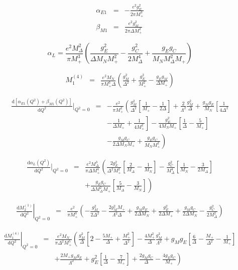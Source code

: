 \documentclass[12pt,preprint,tightenlines,
showpacs,preprintnumbers,amsmath,amssymb,
a4paper,nofootinbib]{revtex4-1}
\def\beq{\begin{equation}}
\def\eeq{\end{equation}}
\def\bea{\begin{eqnarray}}
\def\eea{\end{eqnarray}}
\def\eqlab#1{\label{eq:#1}}
\def\al{\alpha}
\def\be{\beta}
\def\nn{\nonumber}
\def\dd{\mathrm{d}}
\begin{document}
\bea
\eqlab{alphabetaQ2}
\al_{E1}&=&-\frac{e^2 g_E^2}{2 \pi  M_+^3}\\
\be_{M1}&=&\frac{e^2 g_M^2}{2 \pi  \varDelta  M_+^2}
\eea

\beq
\al_L=\frac{e^2 M_\Delta^2}{\pi M_+^3}\left(\frac{ g_E^2}{\varDelta  M_NM_+^2}-\frac{g_C^2}{2 M_\Delta^4}+\frac{ g_E g_C}{M_NM_\Delta^2 M_+}\right)
\eeq

\bea
M_1^{(4)}&=&\frac{e^2 M_N}{\pi M_+^3 \varDelta} \left(\frac{g_M^2}{\varDelta^2}+\frac{g_E^2}{M_+^2}-\frac{g_E g_M}{\varDelta M_+}\right)
\eea

\bea
\frac{\dd \left[\alpha_{E1}(Q^2)+\beta_{M1}(Q^2)\right]}{\dd Q^2}\Bigg\vert_{Q^2=0}&=&-\frac{e^2}{\pi M_+^2}\left(\frac{g_M^2}{\varDelta^2}\left[\frac{1}{M_+}-\frac{1}{2\varDelta}\right]+\frac{2}{ \Lambda^2 }\frac{g_M^2}{\varDelta}\right.+\frac{g_M g_E}{M_N}\left[\frac{1}{4\varDelta^2}\right.\\
&&\left.-\frac{1}{\varDelta M_+}+\frac{1}{4M_+^2}\right] -\frac{g_E^2}{4M_NM_+}\left[\frac{1}{\varDelta}-\frac{5}{M_+}\right]\nn\\
&&\left.-\frac{ g_M g_C}{2  \varDelta  M_NM_+}+\frac{g_E g_C}{M_NM_+^2}\right)\nn
\eea

\bea
\frac{\dd \al_L(Q^2)}{\dd Q^2}\Bigg\vert_{Q^2=0}&=&\frac{e^2 M_\Delta^3}{\pi \varDelta M_+^4}\left(\frac{2g_E^2}{\varDelta^2 M_+^2}\left[\frac{2}{M_\Delta}-\frac{1}{M_N}\right]-\frac{g_C^2}{ M_\Delta^4}\left[\frac{1}{M_N}-\frac{3}{2M_\Delta}\right]\right.  \\
&&+\left.\frac{g_E g_C}{\varDelta M_\Delta^2 M_+}\left[\frac{5}{M_\Delta}-\frac{3}{M_N}\right]\right)\nn
\eea

\bea
\left.\frac{\dd M_2^{(1)} }{\dd Q^2}\right|_{Q^2=0}&=&\frac{e^2 }{\pi M_+^3}\left(-\frac{g_M^2}{2\varDelta^2}-\frac{2g_M^2 M_+}{\Lambda^2 \varDelta}+\frac{g_M g_E}{2\varDelta M_N }+\frac{g_E^2}{2\varDelta M_+}+\frac{g_M g_C}{2\varDelta M_N}-\frac{g_C^2}{2M_\Delta^2}\right)
\eea

\bea
\left.\frac{\dd M_1^{(4)} }{\dd Q^2}\right|_{Q^2=0}&=&\frac{e^2 M_N}{\pi \varDelta^2 M_+^5}\left(\frac{g_M^2}{\varDelta}\left[2-\frac{5M_+}{\varDelta}+\frac{M_+^2}{\varDelta^2}\right]-\frac{4M_+^2}{\varDelta}\frac{g_M^2}{\Lambda^2}+g_M g_E \left[\frac{6}{\varDelta}-\frac{M_+}{\varDelta^2}-\frac{1}{M_+}\right]\right.\\
&&\left.+\frac{2M_+ g_M g_E}{\Lambda^2}+g_E^2\left[\frac{1}{\varDelta}-\frac{7}{M_+}\right]+\frac{2g_M g_C}{\varDelta}-\frac{4g_E g_C}{M_+}\right)\nn
\eea


\newpage

  \small

\end{document}
